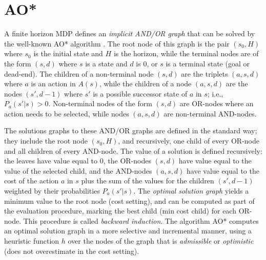 \documentclass[letterpaper]{article}
\begin{document}
\section{AO*}

A finite horizon MDP defines an \emph{implicit AND/OR graph} that can be solved
by the well-known AO* algorithm \cite{nilsson:book}. The root node of this graph
is the pair $(s_0,H)$ where $s_0$ is the initial state and $H$ is the horizon, 
while the terminal nodes are of the form $(s,d)$ where $s$ is a state and
$d$ is $0$, or $s$ is a terminal state (goal or dead-end). 
The children of a non-terminal node $(s,d)$ are the triplets $(a,s,d)$ where $a$
is an action in $A(s)$, while the children of a node $(a,s,d)$ are the nodes
$(s',d-1)$ where $s'$ is a possible successor state of $a$ in $s$; i.e.,
$P_a(s'|s) > 0$.
Non-terminal nodes of the form $(s,d)$ are OR-nodes where an action needs to be
selected, while nodes %
$(a,s,d)$ are non-terminal AND-nodes. 

The solutions graphs to these AND/OR graphs are defined in the standard way;
they include the root node $(s_0,H)$, and recursively, one child of every
OR-node and all children of every AND-node.
The value of a solution is defined recursively: the leaves have value equal to $0$, the OR-nodes $(s,d)$ have
value equal to the value of the selected child, and the AND-nodes $(a,s,d)$
have value equal to the cost of the action $a$ in $s$ plus the sum of
the values for the children $(s',d-1)$ weighted by their probabilities $P_a(s'|s)$.
The \emph{optimal solution graph} yields a minimum value to the root node (cost setting),
and can be computed as part of the evaluation procedure, marking the best child (min cost child)
for each OR-node.  This procedure is called \emph{backward induction}.
The algorithm AO* computes an optimal solution graph in a more selective and incremental 
manner, using a heuristic function $h$ over the nodes of the graph that is \emph{admissible} or
\emph{optimistic} (does not overestimate in the cost setting). 
\end{document}
